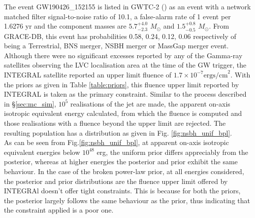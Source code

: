     The event GW190426\_152155 is listed in GWTC-2 (\cite{abbott_2020A}) as an event
    with a network matched filter signal-to-noise ratio of 10.1, a false-alarm rate of 1
    event per 1.6276 yr and the component masses are $5.7^{+4.0}_{-2.3}$ $M_{\odot}$ and
    $1.5^{+0.8}_{-0.5}$ $M_{\odot}$. From GRACE-DB, this event has probabilities 0.58,
    0.24, 0.12, 0.06 respectively of being a Terrestrial, BNS merger, NSBH merger or
    MassGap merger event.\\
    Although there were no significant excesses reported by any of the Gamma-ray
    satellites observing the LVC localisation area at the time of the GW trigger, the
    INTEGRAL satellite reported an upper limit fluence of $1.7 \times 10^{-7} \text{
    ergs/cm}^2$. With the priors as given in Table \ref{table:priors}, this fluence
    upper limit reported by INTEGRAL is taken as the primary constraint.  Similar to the
    process described in \S\ref{sec:mc_sim}, $10^5$ realisations of the jet are made,
    the apparent on-axis isotropic equivalent energy calculated, from which the fluence
    is computed and those realisations with a fluence beyond the upper limit are
    rejected. The resulting population has a distribution as given in Fig.
    \ref{fig:nsbh_unif_bpl}.\\
    As can be seen from Fig.\ref{fig:nsbh_unif_bpl}, at apparent on-axis isotropic
    equivalent energies below $10^{48}$ erg, the uniform prior differs appreciably from
    the posterior, whereas at higher energies the posterior and prior exhibit the same
    behaviour. In the case of the broken power-law prior, at all energies considered,
    the posterior and prior distributions are  the fluence upper limit offered by
    INTEGRAl doesn't offer tight constraints. This is because for both the priors, the
    posterior largely follows the same behaviour as the prior, thus indicating that the
    constraint applied is a poor one.

